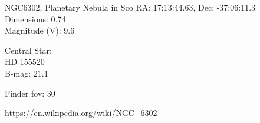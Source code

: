 \begin{block}{NGC6302, Planetary Nebula in Sco}
    RA: 17:13:44.63, Dec: -37:06:11.3 \\ 
    Dimensions: 0.74 \\ 
    Magnitude (V): 9.6


    Central Star: \\ 
      \hspace{1em}HD 155520 \\ 
      \hspace{1em}B-mag: 21.1 


    Finder fov: 30 

    \url{https://en.wikipedia.org/wiki/NGC_6302} 
\end{block}
